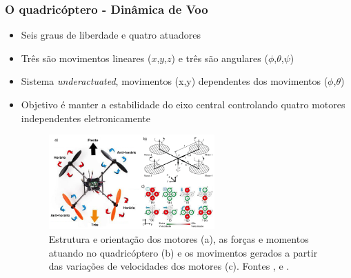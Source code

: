 \documentclass{beamer}
\begin{document}
\begin{frame}[allowframebreaks]
	
	\frametitle{O quadricóptero - Dinâmica de Voo}
	
	\begin{itemize}
		
		\item Seis graus de liberdade e quatro atuadores
				
		\item Três são movimentos lineares ($x$,$y$,$z$) e três são angulares ($\phi$,$\theta$,$\psi$)
						
		\item  Sistema \textit{underactuated}, movimentos (x,y) dependentes dos movimentos ($\phi$,$\theta$)
				
		\item Objetivo é manter a estabilidade do eixo central controlando quatro motores independentes eletronicamente
		
	\framebreak	
		
		\begin{figure}
			\centering
			\includegraphics[keepaspectratio = true,
			width=0.6\textwidth]{img/diagrama_quadricoptero.png}
			\caption{Estrutura e orientação dos motores (a), as forças e momentos atuando no quadricóptero (b) e os movimentos gerados a partir das variações de velocidades dos motores (c). Fontes \cite{quadblog}, \cite{Mian2008} e \cite{Domingues2009}.}
			\label{fig:diag quad}
		\end{figure}
	
	\end{itemize}	
	
\end{frame}	 
\end{document}
